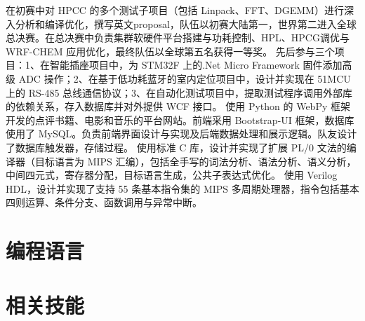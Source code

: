 \documentclass[11pt,a4paper]{moderncv}
\begin{document}
{在初赛中对 HPCC 的多个测试子项目（包括 Linpack、FFT、DGEMM）进行深入分析和编译优化，撰写英文proposal，队伍以初赛大陆第一，世界第二进入全球总决赛。在总决赛中负责集群软硬件平台搭建与功耗控制、HPL、HPCG调优与 WRF-CHEM 应用优化，最终队伍以全球第五名获得一等奖。} 
{先后参与三个项目：1、在智能插座项目中，为 STM32F 上的.Net Micro Framework 固件添加高级 ADC 操作；2、在基于低功耗蓝牙的室内定位项目中，设计并实现在 51MCU 上的 RS-485 总线通信协议；3、在自动化测试项目中，提取测试程序调用外部库的依赖关系，存入数据库并对外提供 WCF 接口。} 
{使用 Python 的 WebPy 框架开发的点评书籍、电影和音乐的平台网站。前端采用 Bootstrap-UI 框架，数据库使用了 MySQL。负责前端界面设计与实现及后端数据处理和展示逻辑。队友设计了数据库触发器，存储过程。} 
{使用标准 C 库，设计并实现了扩展 PL/0 文法的编译器（目标语言为 MIPS 汇编），包括全手写的词法分析、语法分析、语义分析，中间四元式，寄存器分配，目标语言生成，公共子表达式优化。} 
{使用 Verilog HDL，设计并实现了支持 55 条基本指令集的 MIPS 多周期处理器，指令包括基本四则运算、条件分支、函数调用与异常中断。} 
\section{编程语言}

\section{相关技能}
  
\end{document}
